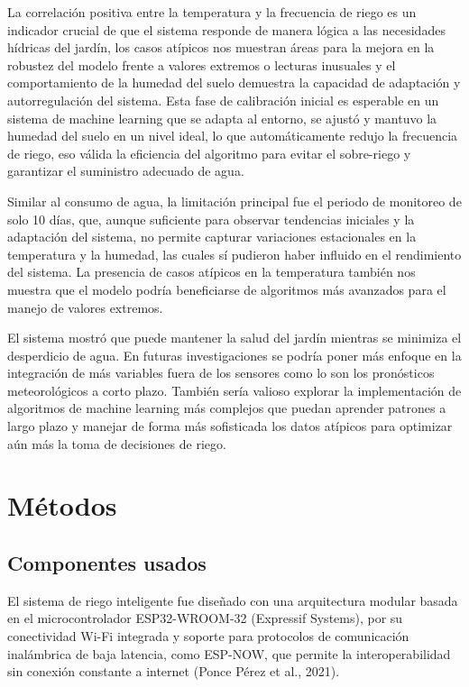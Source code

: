 \documentclass[pdflatex,sn-mathphys-num]{sn-jnl}%
\theoremstyle{thmstyleone}%
\theoremstyle{thmstyletwo}%
\theoremstyle{thmstylethree}%
\begin{document}
\begin{multicols}{2}
La correlación positiva entre la temperatura y la frecuencia de riego es un indicador crucial de que el sistema responde de manera lógica a las necesidades hídricas del jardín, los casos atípicos nos muestran áreas para la mejora en la robustez del modelo frente a valores extremos o lecturas inusuales y el comportamiento de la humedad del suelo demuestra la capacidad de adaptación y autorregulación del sistema. Esta fase de calibración inicial es esperable en un sistema de machine learning que se adapta al entorno, se ajustó y mantuvo la humedad del suelo en un nivel ideal, lo que automáticamente redujo la frecuencia de riego, eso válida la eficiencia del algoritmo para evitar el sobre-riego y garantizar el suministro adecuado de agua.

Similar al consumo de agua, la limitación principal fue el periodo de monitoreo de solo 10 días, que, aunque suficiente para observar tendencias iniciales y la adaptación del sistema, no permite capturar variaciones estacionales en la temperatura y la humedad, las cuales sí pudieron haber influido en el rendimiento del sistema. La presencia de casos atípicos en la temperatura también nos muestra que el modelo podría beneficiarse de algoritmos más avanzados para el manejo de valores extremos.

El sistema mostró que puede mantener la salud del jardín mientras se minimiza el desperdicio de agua. En futuras investigaciones se podría poner más enfoque en la integración de más variables fuera de los sensores como lo son los pronósticos meteorológicos a corto plazo. También sería valioso explorar la implementación de algoritmos de machine learning más complejos que puedan aprender patrones a largo plazo y manejar de forma más sofisticada los datos atípicos para optimizar aún más la toma de decisiones de riego.
\section*{Métodos}

\subsection*{Componentes usados}

El sistema de riego inteligente fue diseñado con una arquitectura modular basada en el microcontrolador ESP32-WROOM-32 (Expressif Systems), por su conectividad Wi-Fi integrada y soporte para protocolos de comunicación inalámbrica de baja latencia, como ESP-NOW, que permite la interoperabilidad sin conexión constante a internet (Ponce Pérez et al., 2021). 


\end{multicols}
\end{document}
